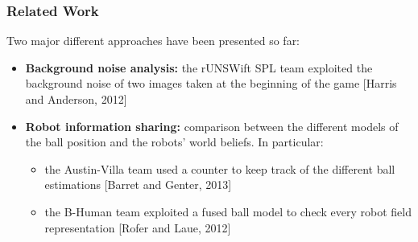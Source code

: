 \begin{frame}
	\frametitle{Related Work}
	
	\vspace{0.4cm}
	
	\large
	
	Two major different approaches have been presented so far:
	
	\begin{itemize}
		\item \textbf{Background noise analysis:} the rUNSWift SPL team exploited the background 
			  noise of two images taken at the beginning of the game [Harris and Anderson, 2012]
		\vspace{0.15cm}
		\item \textbf{Robot information sharing:} comparison between the different models of
			  the ball position and the robots' world beliefs. In particular:
			  
			  \begin{itemize}
			  	  \item the Austin-Villa team used a counter to keep track of the different ball
			  	  		estimations [Barret and Genter, 2013]
			  	  \vspace{0.1cm}
			  	  \item the B-Human team exploited a fused ball model to check every robot field
						representation [Rofer and Laue, 2012]
			  \end{itemize}
	\end{itemize}
\end{frame}
